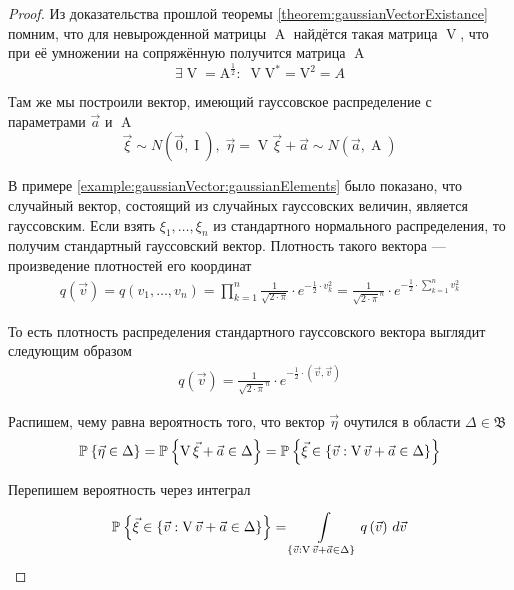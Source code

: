\begin{proof}
  Из доказательства прошлой теоремы \ref{theorem:gaussianVectorExistance}
  помним, что для невырожденной матрицы $\operatorname{A}$ найдётся такая
  матрица $\operatorname{V}$, что при её умножении на сопряжённую получится
  матрица $\operatorname{A}$
  $$\exists \operatorname{V} = \operatorname{A^{\frac{1}{2}}}:\;
      \operatorname{V}\operatorname{V^*} = \operatorname{V^2} = A$$

  Там же мы построили вектор, имеющий гауссовское распределение с параметрами
  $\vec{a}$ и $\operatorname{A}$
  $$\vec{\xi} \sim N\left( \vec{0}, \operatorname{I} \right),\;
      \vec{\eta} = \operatorname{V} \vec{\xi} + \vec{a}
      \sim N\left( \vec{a}, \operatorname{A} \right)$$

  В примере \ref{example:gaussianVector:gaussianElements} было показано, что
  случайный вектор, состоящий из случайных гауссовских величин, является
  гауссовским. Если взять $\xi_1, \dots, \xi_n$ из стандартного нормального
  распределения, то получим стандартный гауссовский вектор. Плотность такого
  вектора --- произведение плотностей его координат
  \begin{align*}
      q\left( \vec{v} \right)
      = q\left( v_1, \dots, v_n \right)
      = \prod_{k=1}^n \frac{1}{\sqrt{2 \cdot \pi}}
      \cdot e^{-\frac{1}{2} \cdot v_k^2}
      = \frac{1}{\sqrt{2 \cdot \pi}^n}
      \cdot e^{-\frac{1}{2} \cdot \sum_{k=1}^n v_k^2}
  \end{align*}

  То есть плотность распределения стандартного гауссовского вектора выглядит
  следующим образом
  \begin{align*}
      q\left( \vec{v} \right)
      = \frac{1}{\sqrt{2 \cdot \pi}^n}
      \cdot e^{-\frac{1}{2} \cdot \left( \vec{v}, \vec{v} \right)}
  \end{align*}

  Распишем, чему равна вероятность того, что вектор $\vec{\eta}$ очутился
  в области $\Delta \in \mathfrak{B}$
  \begin{equation}\label{eq:gaussVectorProbabilityStart}
      \Probability{\vec{\eta} \in \Delta}
      = \Probability{\operatorname{V} \vec{\xi} + \vec{a} \in \Delta}
      = \Probability{\vec{\xi} \in \left\{ \vec{v}:
      \operatorname{V} \vec{v} + \vec{a} \in \Delta \right\}}
  \end{equation}

  Перепишем вероятность через интеграл
  $$\Probability{\vec{\xi} \in \left\{ \vec{v}:
      \operatorname{V} \vec{v} + \vec{a} \in \Delta \right\}}
      = \integrall{\left\{ \vec{v}: \operatorname{V} \vec{v} + \vec{a}
      \in \Delta \right\}}{d\vec{v}}{q\left( \vec{v} \right)}$$


\end{proof}
